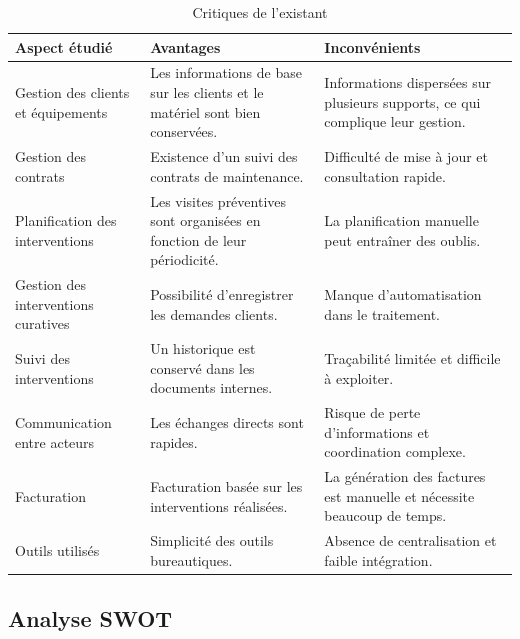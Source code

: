 \begin{table}[H]
\centering
\caption{Critiques de l'existant}
\label{tab:ch1:critiques}
\begin{tabular}{|p{3.8cm}|p{5.5cm}|p{5.5cm}|}
\hline
\textbf{Aspect étudié} & \textbf{Avantages} & \textbf{Inconvénients} \\
\hline
Gestion des clients et équipements
  & Les informations de base sur les clients et le matériel sont bien conservées.
  & Informations dispersées sur plusieurs supports, ce qui complique leur gestion. \\
\hline
Gestion des contrats
  & Existence d'un suivi des contrats de maintenance.
  & Difficulté de mise à jour et consultation rapide. \\
\hline
Planification des interventions
  & Les visites préventives sont organisées en fonction de leur périodicité.
  & La planification manuelle peut entraîner des oublis. \\
\hline
Gestion des interventions curatives
  & Possibilité d'enregistrer les demandes clients.
  & Manque d'automatisation dans le traitement. \\
\hline
Suivi des interventions
  & Un historique est conservé dans les documents internes.
  & Traçabilité limitée et difficile à exploiter. \\
\hline
Communication entre acteurs
  & Les échanges directs sont rapides.
  & Risque de perte d'informations et coordination complexe. \\
\hline
Facturation
  & Facturation basée sur les interventions réalisées.
  & La génération des factures est manuelle et nécessite beaucoup de temps. \\
\hline
Outils utilisés
  & Simplicité des outils bureautiques.
  & Absence de centralisation et faible intégration. \\
\hline
\end{tabular}
\end{table}

\subsection{Analyse SWOT}

